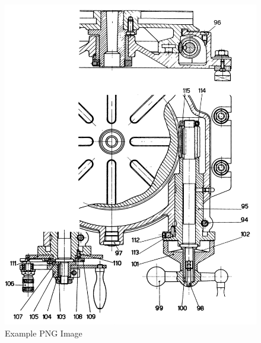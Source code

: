 \newpage
\begin{figure}[h]
    \centering
    \includegraphics[width=1.0\linewidth]{./images/page_33}
    \caption{Example PNG Image}
    \label{fig:rotary_table}
\end{figure}
